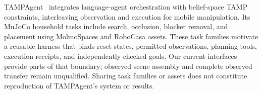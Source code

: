 TAMPAgent~\citep{mishra2026tampagent} integrates language-agent orchestration with
belief-space TAMP constraints, interleaving observation and execution for mobile
manipulation. Its MuJoCo household tasks include search, occlusion, blocker
removal, and placement using MolmoSpaces and RoboCasa assets. These task families
motivate a reusable harness that binds reset states, permitted observations,
planning tools, execution receipts, and independently checked goals. Our current
interfaces provide parts of that boundary; observed scene assembly and complete
observed transfer remain unqualified. Sharing task families or assets does not
constitute reproduction of TAMPAgent's system or results.
